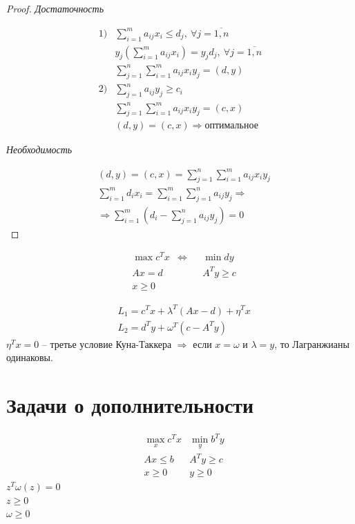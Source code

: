 \documentclass[12pt,a4paper,titlepage,oneside]{book}
\theoremstyle{definition}
\theoremstyle{plain}
\theoremstyle{remark}
\theoremstyle{remark}
\theoremstyle{plain}
\theoremstyle{plain}
\begin{document}
\begin{proof}

\textit{Достаточность}


\begin{align*}
1) &\sum\limits_{i=1}^m a_{ij} x_i \leq d_j, \: \forall j = \overline{1,n}\\
&y_j \left( \sum\limits_{i=1}^m a_{ij} x_i \right) = y_j d_j, \: \forall j = \overline{1,n}\\
&\sum\limits_{j=1}^n \sum\limits_{i=1}^m a_{ij} x_i y_j = (d,y) \\
2) & \sum\limits_{j=1}^n a_{ij} y_j \geq c_i \\
&\sum\limits_{j=1}^n \sum\limits_{i=1}^m a_{ij} x_i y_j = (c,x) \\
&(d,y) = (c,x) \Rightarrow \text{оптимальное}
\end{align*}


\textit{Необходимость}


\begin{align*}
&(d,y) = (c,x) = \sum\limits_{j=1}^n \sum\limits_{i=1}^m a_{ij} x_i y_j\\
&\sum\limits_{i=1}^m d_i x_i = \sum\limits_{i=1}^m \sum\limits_{j=1}^n a_{ij} y_j \Rightarrow \\
& \Rightarrow \sum\limits_{i=1}^m (d_i - \sum\limits_{j=1}^n a_{ij} y_j) = 0
\end{align*}
\end{proof}

\begin{align*}
 &\max  c^Tx  &\Leftrightarrow&  &\min  dy \\
 &Ax = d& & &A^Ty \geq c\\
 & x \geq 0
\end{align*}

\begin{align*}
&L_1 = c^Tx + \lambda^T (Ax-d) + \eta^Tx \\
&L_2 = d^Ty + \omega^T(c-A^Ty)
\end{align*}
$\eta^T x = 0$ -- третье условие Куна-Таккера $\Rightarrow$ если $x=\omega$ и $\lambda = y$, то Лагранжианы одинаковы.

\section{Задачи о дополнительности}
\begin{align*}
 &\max\limits_x  c^Tx    &\min\limits_y  b^Ty \\
 &Ax \leq b  &A^Ty \geq c\\
 & x \geq 0 & y \geq 0
\end{align*}
$z^T \omega (z) = 0$\\
$z\geq 0$\\
$\omega \geq 0$\\
\end{document}
